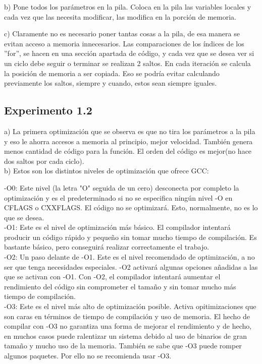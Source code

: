 ﻿\documentclass[a4paper]{article}
\begin{document}
b) Pone todos los par\'ametros en la pila. Coloca en la pila las variables locales y cada vez que las necesita modificar, las modifica en la porci\'on de memoria.

c) Claramente no es necesario poner tantas cosas a la pila, de esa manera se evitan acceso a memoria innecesarios. Las comparaciones de los índices de los ''for'', se hacen en una secci\'on apartada de c\'odigo, y cada vez que se desea ver si un ciclo debe seguir o terminar se realizan 2 saltos. En cada iteraci\'on se calcula la posici\'on de memoria a ser copiada. Eso se podr\'ia evitar calculando previamente los saltos, siempre y cuando, estos sean siempre iguales. 
	
\subsection{Experimento 1.2}

a) La primera optimizaci\'on que se observa es que no tira los parámetros a la pila y eso le ahorra accesos a memoria al principio, mejor velocidad. Tambi\'en genera menos cantidad de c\'odigo para la funci\'on. El orden del c\'odigo es mejor(no hace dos saltos por cada ciclo).  \\

\newpage
b) Estos son los distintos niveles de optimización que ofrece GCC:

-O0: Este nivel (la letra "O" seguida de un cero) desconecta por completo la optimización y es el predeterminado si no se especifica ningún nivel -O en CFLAGS o CXXFLAGS. El código no se optimizará. Esto, normalmente, no es lo que se desea.\\

-O1: Este es el nivel de optimización más básico. El compilador intentará producir un código rápido y pequeño sin tomar mucho tiempo de compilación. Es bastante básico, pero conseguirá realizar correctamente el trabajo.\\

-O2: Un paso delante de -O1. Este es el nivel recomendado de optimización, a no ser que tenga necesidades especiales. -O2 activará algunas opciones añadidas a las que 
se activan con -O1. Con -O2, el compilador intentará aumentar el rendimiento del código sin comprometer el tamaño y sin tomar mucho más tiempo de compilación.\\

-O3: Este es el nivel más alto de optimización posible. Activa opitimizaciones que son caras en términos de tiempo de compilación y uso de memoria. El hecho de compilar con -O3 no garantiza una forma de mejorar el rendimiento y de hecho, en muchos casos puede ralentizar un sistema debido al uso de binarios de gran tamaño y mucho uso de la memoria. También se sabe que -O3 puede romper algunos paquetes. Por ello no se recomienda usar -O3.\\
\end{document}
